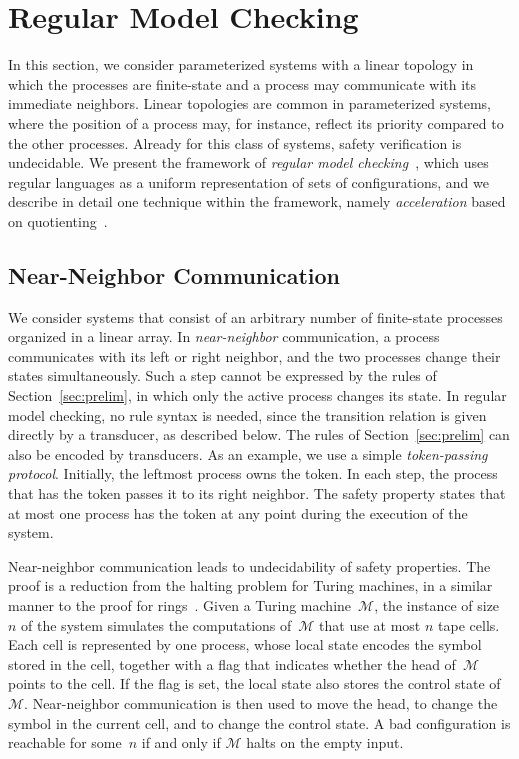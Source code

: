 \section{Regular Model Checking}
\label{sec:rmc}

In this section, we consider parameterized systems with a linear topology in
which the processes are finite-state and a process may communicate with its
immediate neighbors. Linear topologies are common in parameterized systems,
where the position of a process may, for instance, reflect its priority
compared to the other processes. Already for this class of systems, safety
verification is undecidable. We present the framework
of \emph{regular model checking}~\cite{KMMPS97,KW01,BW98,BJNT00}, which uses
regular languages as a uniform representation of sets of configurations, and
we describe in detail one technique within the framework, namely
\emph{acceleration} based on quotienting~\cite{AJNO02,AJNO03}.

\subsection{Near-Neighbor Communication}

We consider systems that consist of an arbitrary number of finite-state
processes organized in a linear array. In \emph{near-neighbor}
communication, a process communicates with its left or right neighbor, and the
two processes change their states simultaneously. Such a step cannot be
expressed by the rules of Section~\ref{sec:prelim}, in which only the active
process changes its state. In regular model checking, no rule syntax is
needed, since the transition relation is given directly by a transducer, as
described below. The rules of Section~\ref{sec:prelim} can also be encoded by
transducers. As an example, we use a
simple \emph{token-passing protocol}. Initially, the leftmost process owns the
token. In each step, the process that has the token passes it to its right
neighbor. The safety property states that at most one process has the token
at any point during the execution of the system.

Near-neighbor communication leads to undecidability of safety properties. The
proof is a reduction from the halting problem for Turing machines, in a
similar manner to the proof for rings~\cite{Suz88}. Given a Turing
machine~$\mathcal{M}$, the instance of size~$n$ of the system simulates the
computations of~$\mathcal{M}$ that use at most $n$ tape cells. Each cell is
represented by one process, whose local state encodes the symbol stored in the
cell, together with a flag that indicates whether the head of~$\mathcal{M}$
points to the cell. If the flag is set, the local state also stores the
control state of~$\mathcal{M}$. Near-neighbor communication is then used to
move the head, to change the symbol in the current cell, and to change the
control state. A bad configuration is reachable for some~$n$ if and only if
$\mathcal{M}$ halts on the empty input.

